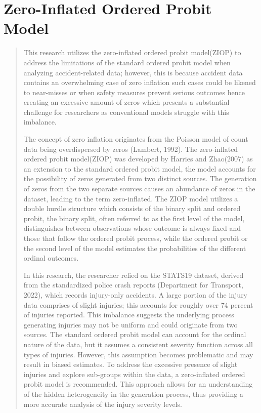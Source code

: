 \documentclass[12]{report}
\begin{document}
\section{Zero-Inflated Ordered Probit Model}
\begin{quote}
{\large 

This research utilizes the zero-inflated ordered probit model(ZIOP) to address the limitations of the standard ordered probit model when analyzing accident-related data; however, this is because accident data contains an overwhelming case of zero inflation such cases could be likened to near-misses  or when safety measures prevent serious outcomes hence creating an excessive amount of zeros which presents a substantial challenge for researchers as conventional models struggle with this imbalance. 

The concept of zero inflation originates from the Poisson model of count data being overdispersed by zeros (Lambert, 1992). The zero-inflated ordered probit model(ZIOP) was developed by Harries and Zhao(2007) as an extension to the standard ordered probit model, the model accounts for the possibility of zeros generated from two distinct sources. The generation of zeros from the two separate sources causes an abundance of zeros in the dataset, leading to the term zero-inflated. The ZIOP model utilizes a double hurdle structure which consists of the binary split and ordered probit, the binary split, often referred to as the first level of the model, distinguishes between observations whose outcome is always fixed and those that follow the ordered probit process, while the ordered probit or the second level of the model estimates the probabilities of the different ordinal outcomes.

In this research, the researcher relied on the STATS19 dataset, derived from the standardized police crash reports (Department for Transport, 2022), which records injury-only accidents. A large portion of the injury data comprises of slight injuries; this accounts for roughly over 74 percent of injuries reported. This imbalance suggests the underlying process generating injuries may not be uniform and could originate from two sources. The standard ordered probit model can account for the ordinal nature of the data, but it assumes a consistent severity function across all types of injuries. However, this assumption becomes problematic and may result in biased estimates. To address the excessive presence of slight injuries and explore sub-groups within the data, a zero-inflated ordered probit model is recommended.
This approach allows for an understanding of the hidden heterogeneity in the generation process, thus providing a more accurate analysis of the injury severity levels. 

}
\end{quote}
\end{document}
